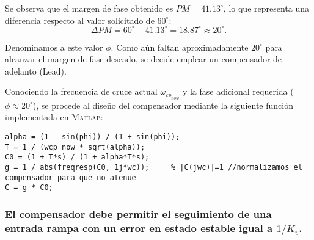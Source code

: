 Se observa que el margen de fase obtenido es $PM = 41.13^\circ$, lo que representa una diferencia respecto al valor solicitado de $60^\circ$:
\[
\Delta PM = 60^\circ - 41.13^\circ = 18.87^\circ \approx 20^\circ.
\]

Denominamos a este valor $\phi$. Como aún faltan aproximadamente $20^\circ$ para alcanzar el margen de fase deseado, se decide emplear un compensador de adelanto (Lead).  

Conociendo la frecuencia de cruce actual $\omega_{cp_{now}}$ y la fase adicional requerida ($\phi \approx 20^\circ$), se procede al diseño del compensador mediante la siguiente función implementada en \textsc{Matlab}:

\begin{lstlisting}[style=matlabstyle,caption={Primer intento: Compensador 1.},label={matlab:comp1}]
alpha = (1 - sin(phi)) / (1 + sin(phi));
T = 1 / (wcp_now * sqrt(alpha));
C0 = (1 + T*s) / (1 + alpha*T*s);
g = 1 / abs(freqresp(C0, 1j*wc));     % |C(jwc)|=1 //normalizamos el compensador para que no atenue
C = g * C0;
\end{lstlisting}


\subsubsection{El compensador debe permitir el seguimiento de una entrada rampa con un error en estado estable igual a $1/K_v$.}
